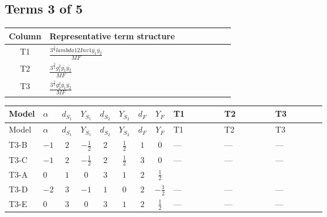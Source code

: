\documentclass[8pt]{article}
\begin{document}
\begin{landscape}
\subsection*{Terms 3 of 5}
\begin{center}
\begin{tabular}{@{}c >{\raggedright\arraybackslash}p{0.82\linewidth}@{}}
\toprule
Column & Representative term structure \\
\midrule
T1 & \(\displaystyle \frac{3^{\frac{3}{4}} lambda12Inv1 \overline{y_{1}} \overline{y_{2}}}{MF}\) \\
\midrule
T2 & \(\displaystyle \frac{3^{\frac{3}{4}} g_{1}^{2} \overline{y_{1}} \overline{y_{2}}}{MF}\) \\
\midrule
T3 & \(\displaystyle \frac{3^{\frac{3}{4}} g_{2}^{2} \overline{y_{1}} \overline{y_{2}}}{MF}\) \\
\midrule
\bottomrule
\end{tabular}
\end{center}
\smallskip
\tiny
\begin{longtable}{@{}llcccccc >{\raggedright\arraybackslash}p{0.21\linewidth} >{\raggedright\arraybackslash}p{0.21\linewidth} >{\raggedright\arraybackslash}p{0.21\linewidth}@{}}
\toprule
Model & $\alpha$ & $d_{S_1}$ & $Y_{S_1}$ & $d_{S_2}$ & $Y_{S_2}$ & $d_F$ & $Y_F$ & T1 & T2 & T3 \\
\midrule
\endfirsthead
\toprule
Model & $\alpha$ & $d_{S_1}$ & $Y_{S_1}$ & $d_{S_2}$ & $Y_{S_2}$ & $d_F$ & $Y_F$ & T1 & T2 & T3 \\
\midrule
\endhead
T3-B & $-1$ & $2$ & $-\frac{1}{2}$ & $2$ & $\frac{1}{2}$ & $1$ & $0$ & --- & --- & --- \\
\midrule
T3-C & $-1$ & $2$ & $-\frac{1}{2}$ & $2$ & $\frac{1}{2}$ & $3$ & $0$ & --- & --- & --- \\
\midrule
T3-A & $0$ & $1$ & $0$ & $3$ & $1$ & $2$ & $\frac{1}{2}$ & \scriptsize\adjustbox{max width=\linewidth}{$\begin{gathered} \frac{3^{\frac{3}{4}} lambda12Inv1 \overline{y_{1}} \overline{y_{2}}}{6 MF}\end{gathered}$} & \scriptsize\adjustbox{max width=\linewidth}{$\begin{gathered} \frac{3^{\frac{3}{4}} g_{1}^{2} \overline{y_{1}} \overline{y_{2}}}{8 MF}\end{gathered}$} & \scriptsize\adjustbox{max width=\linewidth}{$\begin{gathered} \frac{17 \cdot 3^{\frac{3}{4}} g_{2}^{2} \overline{y_{1}} \overline{y_{2}}}{24 MF}\end{gathered}$} \\
\midrule
T3-D & $-2$ & $3$ & $-1$ & $1$ & $0$ & $2$ & $-\frac{1}{2}$ & --- & --- & --- \\
\midrule
T3-E & $0$ & $3$ & $0$ & $3$ & $1$ & $2$ & $\frac{1}{2}$ & --- & --- & --- \\
\midrule
\bottomrule
\end{longtable}
\clearpage

\end{landscape}
\end{document}
